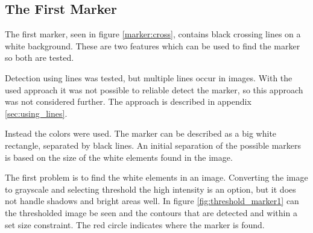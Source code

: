 \subsection{The First Marker}\label{sec:full_marker1}
The first marker, seen in figure \ref{marker:cross}, contains black crossing lines on a white background.
These are two features which can be used to find the marker so both are tested.

Detection using lines was tested, but multiple lines occur in images.
With the used approach it was not possible to reliable detect the marker, so this approach was not considered further.
The approach is described in appendix \ref{sec:using_lines}.

Instead the colors were used.
The marker can be described as a big white rectangle, separated by black lines.
An initial separation of the possible markers is based on the size of the white elements found in the image.

The first problem is to find the white elements in an image.
Converting the image to grayscale and selecting threshold the high intensity is an option, but it does not handle shadows and bright areas well.
In figure \ref{fig:threshold_marker1} can the thresholded image be seen and the contours that are detected and within a set size constraint.
The red circle indicates where the marker is found.

